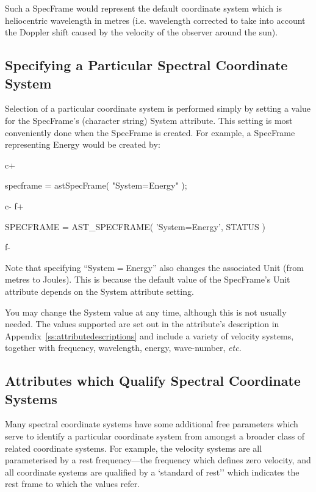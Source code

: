 \documentclass[twoside,11pt]{starlink}
\providecommand{\appref}[1]{Appendix~\ref{#1}}
\begin{document}
Such a SpecFrame would represent the default coordinate system which is
heliocentric wavelength in metres (i.e. wavelength corrected to take into
account the Doppler shift caused by the velocity of the observer around the
sun).

\subsection{Specifying a Particular Spectral Coordinate System}

Selection of a particular coordinate system is performed simply by
setting a value for the SpecFrame's (character string) System
attribute. This setting is most conveniently done when the SpecFrame is
created. For example, a SpecFrame representing Energy would be created by:

c+
\small
\begin{terminalv}
specframe = astSpecFrame( "System=Energy" );
\end{terminalv}
\normalsize
c-
f+
\small
\begin{terminalv}
      SPECFRAME = AST_SPECFRAME( 'System=Energy', STATUS )
\end{terminalv}
\normalsize
f-

Note that specifying ``System$=$Energy'' also changes the associated
Unit (from metres to Joules). This is because the default value
of the SpecFrame's Unit attribute depends on the System attribute setting.

You may change the System value at any time, although this is not
usually needed.  The values supported are set out in the attribute's
description in \appref{ss:attributedescriptions} and include a variety
of velocity systems, together with frequency, wavelength, energy,
wave-number, \emph{etc}.

\subsection{Attributes which Qualify Spectral Coordinate Systems}

Many spectral coordinate systems have some additional free parameters
which serve to identify a particular coordinate system from amongst a
broader class of related coordinate systems. For example, the
velocity systems are all parameterised by a rest frequency---the
frequency which defines zero velocity, and all coordinate systems
are qualified by a `standard of rest'' which indicates the rest frame to
which the values refer.
\end{document}
